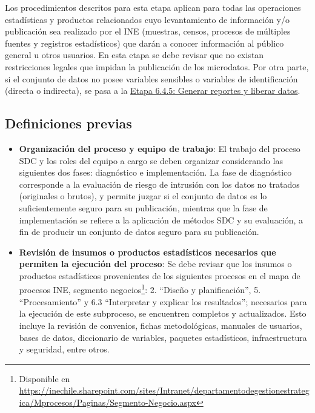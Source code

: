 \documentclass[]{book}
\theoremstyle{definition}
\theoremstyle{definition}
\theoremstyle{definition}
\theoremstyle{definition}
\theoremstyle{remark}
\begin{document}
Los procedimientos descritos para esta etapa aplican para todas las operaciones estadísticas y productos relacionados cuyo levantamiento de información y/o publicación sea realizado por el INE (muestras, censos, procesos de múltiples fuentes y registros estadísticos) que darán a conocer información al público general u otros usuarios.
En esta etapa se debe revisar que no existan restricciones legales que impidan la publicación de los microdatos.
Por otra parte, si el conjunto de datos no posee variables sensibles o variables de identificación (directa o indirecta), se pasa a la \protect\hyperlink{etapa-6.4.5-generar-reportes-y-liberar-datos}{Etapa 6.4.5: Generar reportes y liberar datos}.

\hypertarget{definiciones-previas}{%
\subsection{Definiciones previas}\label{definiciones-previas}}

\begin{itemize}
\item
  \textbf{Organización del proceso y equipo de trabajo}: El trabajo del proceso SDC y los roles del equipo a cargo se deben organizar considerando las siguientes dos fases: diagnóstico e implementación. La fase de diagnóstico corresponde a la evaluación de riesgo de intrusión con los datos no tratados (originales o brutos), y permite juzgar si el conjunto de datos es lo suficientemente seguro para su publicación, mientras que la fase de implementación se refiere a la aplicación de métodos SDC y su evaluación, a fin de producir un conjunto de datos seguro para su publicación.
\item
  \textbf{Revisión de insumos o productos estadísticos necesarios que permiten la ejecución del proceso}: Se debe revisar que los insumos o productos estadísticos provenientes de los siguientes procesos en el mapa de procesos INE, segmento negocios\footnote{Disponible en \url{https://inechile.sharepoint.com/sites/Intranet/departamentodegestionestrategica/Mprocesos/Paginas/Segmento-Negocio.aspx}}: 2. ``Diseño y planificación'', 5. ``Procesamiento'' y 6.3 ``Interpretar y explicar los resultados''; necesarios para la ejecución de este subproceso, se encuentren completos y actualizados. Esto incluye la revisión de convenios, fichas metodológicas, manuales de usuarios, bases de datos, diccionario de variables, paquetes estadísticos, infraestructura y seguridad, entre otros.
\end{itemize}
\end{document}
